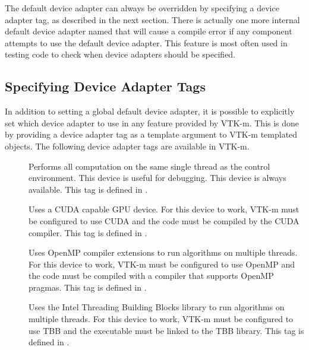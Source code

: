 
The default device adapter can always be overridden by specifying a device
adapter tag, as described in the next section. There is actually one more
internal default device adapter named
 that will cause a compile error if
any component attempts to use the default device adapter. This feature is
most often used in testing code to check when device adapters should be
specified.

\subsection{Specifying Device Adapter Tags}

In addition to setting a global default device adapter, it is possible to
explicitly set which device adapter to use in any feature provided by
VTK-m. This is done by providing a device adapter tag as a template
argument to VTK-m templated objects. The following device adapter tags are
available in VTK-m.


\begin{description}
\item[]  Performs all
  computation on the same single thread as the control environment. This
  device is useful for debugging. This device is always available. This tag
  is defined in .
\item[]  Uses a CUDA capable
  GPU device. For this device to work, VTK-m must be configured to use CUDA
  and the code must be compiled by the CUDA 
  compiler. This tag is defined in
  .
\item[]  Uses OpenMP
  compiler extensions to run algorithms on multiple threads. For this
  device to work, VTK-m must be configured to use OpenMP and the code must be
  compiled with a compiler that supports OpenMP pragmas. This tag is
  defined in . 
\item[]
    Uses the Intel
  Threading Building Blocks library to run algorithms on multiple
  threads. For this device to work, VTK-m must be configured to use TBB and
  the executable must be linked to the TBB library. This tag is defined in
  .
\end{description}

